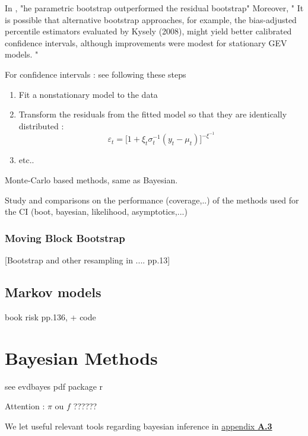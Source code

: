 \documentclass[11pt,a4paper,openany ]{book}
\begin{document}
In \citet{cannon_flexible_2010}, "he parametric bootstrap outperformed the residual bootstrap"
Moreover, " It is possible that alternative bootstrap approaches, for example, the bias-adjusted percentile estimators evaluated by Kysely
(2008), might yield better calibrated confidence intervals, although improvements were modest for stationary GEV models. "


For confidence intervals : see \citet[pp.681]{cannon_flexible_2010} 
following these steps

\begin{enumerate}
	\item Fit a nonstationary model to the data
	\item Transform the residuals from the fitted model so that they are identically distributed :
	\begin{equation}
	\varepsilon_t=\bigg[1+\xi_t\sigma^{-1}_t(y_t-\mu_t)\bigg]^{-\xi^{-1}}
	\end{equation}
	\item etc..
\end{enumerate}

Monte-Carlo based methods, same as Bayesian.

Study and comparisons on the performance (coverage,..) of the methods used for the CI (boot, bayesian, likelihood, asymptotics,...)
\subsection{Moving Block Bootstrap}

[Bootstrap and other resampling in .... pp.13]


\section{Markov models}
book risk pp.136, \cite{shaby_markov-switching_2016} + code





\chapter{Bayesian Methods}\label{sec::bayesian}
\vspace{-1cm}
\minitoc\thispagestyle{empty}

see evdbayes pdf package r

Attention : $\pi$ ou $f$ ?????? 

We let useful relevant tools regarding bayesian inference in \hyperref[bayesapp]{appendix 
	\textbf{A.3}}
\end{document}

